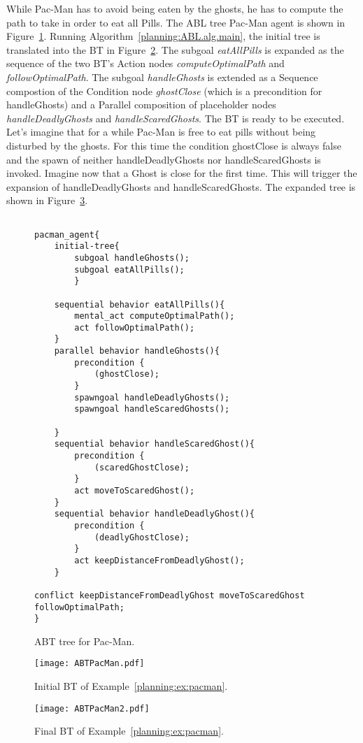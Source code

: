 \begin{example}
\label{planning:ex:pacman}
While Pac-Man has to avoid being eaten by the ghosts, he has to compute the path to take in order to eat all Pills. The ABL tree Pac-Man agent is shown in Figure~\ref{planning:abl.fig.abtpacman1code}.
Running Algorithm~\ref{planning:ABL.alg.main}, the initial tree is translated into the BT in Figure~\ref{planning:abl.fig.abtpacman1BT}.
The subgoal \emph{eatAllPills} is expanded as the sequence of the two BT's Action nodes \emph{computeOptimalPath} and \emph{followOptimalPath}. The subgoal \emph{handleGhosts} is extended as a Sequence compostion of the Condition node \emph{ghostClose} (which is a precondition for handleGhosts) and a Parallel composition of placeholder nodes \emph{handleDeadlyGhosts} and \emph{handleScaredGhosts}. 
The BT is ready to be executed. Let's imagine that for a while Pac-Man is free to eat pills without being disturbed by the ghosts. For this time the condition  ghostClose is always false and the spawn of neither handleDeadlyGhosts nor handleScaredGhosts is invoked. Imagine now that a Ghost is close for the first time. This will trigger the expansion of  handleDeadlyGhosts and handleScaredGhosts. The expanded tree is shown in Figure~\ref{planning:abl.fig.abtpacman2BT}.
\begin{figure}[h]
\centering
\begin{lstlisting}

pacman_agent{
	initial-tree{
		subgoal handleGhosts();
		subgoal eatAllPills();
		}

	sequential behavior eatAllPills(){
		mental_act computeOptimalPath();
		act followOptimalPath();
	}
	parallel behavior handleGhosts(){
		precondition {
		    (ghostClose);
		}
		spawngoal handleDeadlyGhosts();
		spawngoal handleScaredGhosts();

	}
	sequential behavior handleScaredGhost(){
		precondition {
		    (scaredGhostClose);
		}
		act moveToScaredGhost();
	}
	sequential behavior handleDeadlyGhost(){
		precondition {
		    (deadlyGhostClose);
		}
		act keepDistanceFromDeadlyGhost();
	}

conflict keepDistanceFromDeadlyGhost moveToScaredGhost followOptimalPath; 
}
\end{lstlisting}
\caption{ABT tree for Pac-Man.}
\label{planning:abl.fig.abtpacman1code}
\end{figure}

\begin{figure}[h]
\centering
\texttt{[image: ABTPacMan.pdf]}
\caption{Initial BT of Example~\ref{planning:ex:pacman}.}
\label{planning:abl.fig.abtpacman1BT}
\end{figure}

\begin{figure}[h]
\centering
\texttt{[image: ABTPacMan2.pdf]}
\caption{Final BT of Example~\ref{planning:ex:pacman}.}
\label{planning:abl.fig.abtpacman2BT}
\end{figure}


\end{example}

